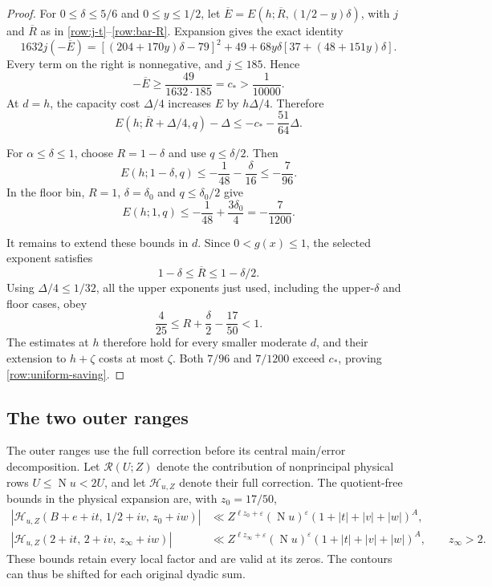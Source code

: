 \documentclass[11pt,a4paper]{article}
\numberwithin{equation}{section}
\theoremstyle{definition}
\theoremstyle{remark}
\newcommand{\eps}{\varepsilon}
\newcommand{\Norm}{\operatorname{N}}
\begin{document}
\begin{proof}
For \(0\le\delta\le5/6\) and \(0\le y\le1/2\), let
\(\overline E=E(h;\overline R,(1/2-y)\delta)\), with \(j\) and
\(\overline R\) as in \eqref{row:j-t}--\eqref{row:bar-R}.
Expansion gives the exact identity
\begin{equation}\label{row:square-certificate}
 \boxed{\;
 1632j(-\overline E)
 =[(204+170y)\delta-79]^2+49
  +68y\delta[37+(48+151y)\delta].
 \;}
\end{equation}
Every term on the right is nonnegative, and \(j\le185\).  Hence
\[
 -\overline E\ge\frac{49}{1632\cdot185}
 =c_*>\frac1{10000}.
\]
At \(d=h\), the capacity cost \(\Delta/4\) increases \(E\) by
\(h\Delta/4\).  Therefore
\begin{equation}\label{row:relative-saving}
 E(h;\overline R+\Delta/4,q)-\Delta
 \le-c_*-\frac{51}{64}\Delta.
\end{equation}

For \(\alpha\le\delta\le1\), choose \(R=1-\delta\) and use
\(q\le\delta/2\).  Then
\[
 E(h;1-\delta,q)
 \le-\frac1{48}-\frac\delta{16}\le-\frac7{96}.
\]
In the floor bin, \(R=1\), \(\delta=\delta_0\) and
\(q\le\delta_0/2\) give
\[
 E(h;1,q)\le-\frac1{48}+\frac{3\delta_0}{4}
 =-\frac7{1200}.
\]

It remains to extend these bounds in \(d\).  Since
\(0<g(x)\le1\), the selected exponent satisfies
\[
 1-\delta\le\overline R\le1-\delta/2.
\]
Using \(\Delta/4\le1/32\), all the upper exponents just used,
including the upper-\(\delta\) and floor cases, obey
\begin{equation}\label{row:positive-slope}
 \frac4{25}\le R+\frac\delta2-\frac{17}{50}<1.
\end{equation}
The estimates at \(h\) therefore hold for every smaller moderate
\(d\), and their extension to \(h+\zeta\) costs at most \(\zeta\).
Both \(7/96\) and \(7/1200\) exceed \(c_*\), proving
\eqref{row:uniform-saving}.
\end{proof}

\subsection{The two outer ranges}
\label{row:outer}

The outer ranges use the full correction before its central
main/error decomposition.  Let \(\mathcal R(U;Z)\) denote the
contribution of nonprincipal physical rows
\(U\le\Norm u<2U\), and let \(\mathcal H_{u,Z}\) denote their full
correction.  The quotient-free bounds in the physical expansion are,
with \(z_0=17/50\),
\begin{align}
 |\mathcal H_{u,Z}(B+e+it,\,1/2+iv,\,z_0+iw)|
 &\ll Z^{\ell z_0+\eps}(\Norm u)^\eps
        (1+|t|+|v|+|w|)^A,\label{row:small-correction}\\
 |\mathcal H_{u,Z}(2+it,\,2+iv,\,z_\infty+iw)|
 &\ll Z^{\ell z_\infty+\eps}(\Norm u)^\eps
        (1+|t|+|v|+|w|)^A,
 \qquad z_\infty>2.
 \label{row:large-correction}
\end{align}
These bounds retain every local factor and are valid at its zeros.
The contours can thus be shifted for each original dyadic sum.
\end{document}
